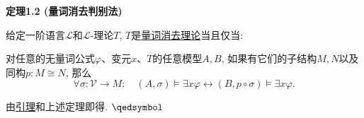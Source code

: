 \documentclass[UTF8]{ctexart}
\begin{document}
\newpage

\hypertarget{sec:定理1.2}{}
\noindent\textbf{定理1.2 (量词消去判别法)}

给定一阶语言$\mathcal{L}$和$\mathcal{L}$-理论$T$,
$T$是\href{01 量词消去理论#nameddest=sec:定义1.2}{量词消去理论}当且仅当:

对任意的无量词公式$\varphi$、变元$x$、$T$的任意模型$A,B$,
如果有它们的子结构$M,N$以及同构$p:M\cong N$, 那么
\[
    \forall\sigma:\mathcal{V}\to M:\quad
    (A,\sigma)\models\exists x\varphi\leftrightarrow
    (B,p\circ\sigma)\models\exists x\varphi.
\]


由\href{01 量词消去理论#nameddest=sec:定理1.2}{引理}和上述定理即得.
\hfill $\qedsymbol$

\end{document}
